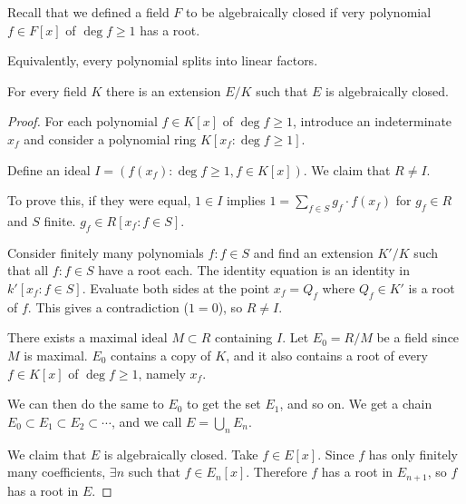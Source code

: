 \documentclass[a4paper,twoside,master.tex]{subfiles}
\begin{document}

Recall that we defined a field $ F $ to be algebraically closed if very polynomial $ f \in F[x] $ of $ \deg f \geq 1 $ has a root.

Equivalently, every polynomial splits into linear factors.

\begin{claim}
    For every field $ K $ there is an extension $ E/K $ such that $ E $ is algebraically closed.
\end{claim}
\begin{proof}
    For each polynomial $ f \in K[x] $ of $ \deg f \geq 1 $, introduce an indeterminate $ x_f $ and consider a polynomial ring $ K[x_f \colon \deg f \geq 1] $.

    Define an ideal $ I = (f(x_f)\colon \deg f \geq 1, f \in K[x]) $. We claim that $ R \neq I $.
    
    To prove this, if they were equal, $ 1 \in I $ implies $ 1 = \sum_{f \in S} g_f \cdot f(x_f) $ for $ g_f \in R $ and $ S $ finite. $ g_f \in R[x_f \colon f \in S] $.
    
    Consider finitely many polynomials $ f \colon f \in S $ and find an extension $ K'/K $ such that all $ f \colon f \in S $ have a root each. The identity equation is an identity in $ k'[x_f \colon f \in S] $. Evaluate both sides at the point $ x_f = Q_f $ where $ Q_f \in K' $ is a root of $ f $. This gives a contradiction ($ 1=0 $), so $ R \neq I $. 

    There exists a maximal ideal $ M \subset R $ containing $ I $. Let $ E_0 = R/M $ be a field since $ M $ is maximal. $ E_0 $ contains a copy of $ K $, and it also contains a root of every $ f \in K[x] $ of $ \deg f \geq 1 $, namely $ x_f $.

    We can then do the same to $ E_0 $ to get the set $ E_1 $, and so on. We get a chain $ E_0 \subset E_1 \subset E_2 \subset \cdots $, and we call $ E = \bigcup_n E_n $.

    We claim that $ E $ is algebraically closed. Take $ f \in E[x] $. Since $ f $ has only finitely many coefficients, $ \exists n $ such that $ f \in E_n[x] $. Therefore $ f $ has a root in $ E_{n+1} $, so $ f $ has a root in $ E $.
\end{proof}
\end{document}

